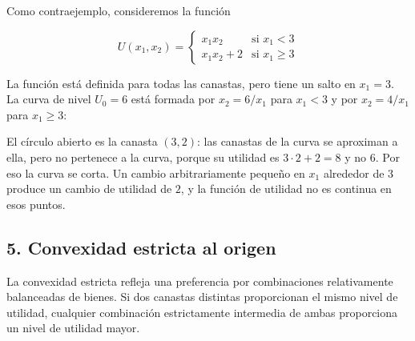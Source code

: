 \documentclass{article}
\begin{document}
Como contraejemplo, consideremos la función

\[
U(x_1,x_2)=
\begin{cases}
x_1x_2 & \text{si } x_1<3\\[2pt]
x_1x_2+2 & \text{si } x_1\geq 3
\end{cases}
\]

La función está definida para todas las canastas, pero tiene un salto en \(x_1=3\). La curva de nivel \(U_0=6\) está formada por \(x_2=6/x_1\) para \(x_1<3\) y por \(x_2=4/x_1\) para \(x_1\geq 3\):

\begin{center}
\end{center}

El círculo abierto es la canasta \((3,2)\): las canastas de la curva se aproximan a ella, pero no pertenece a la curva, porque su utilidad es \(3\cdot 2+2=8\) y no \(6\). Por eso la curva se corta. Un cambio arbitrariamente pequeño en \(x_1\) alrededor de \(3\) produce un cambio de utilidad de \(2\), y {\color{teal}la función de utilidad no es continua en esos puntos}.

\subsection*{5. Convexidad estricta al origen}

La convexidad estricta refleja una preferencia por {\color{teal}combinaciones relativamente balanceadas de bienes}. Si dos canastas distintas proporcionan el mismo nivel de utilidad, cualquier combinación estrictamente intermedia de ambas proporciona un nivel de utilidad mayor.
\end{document}
